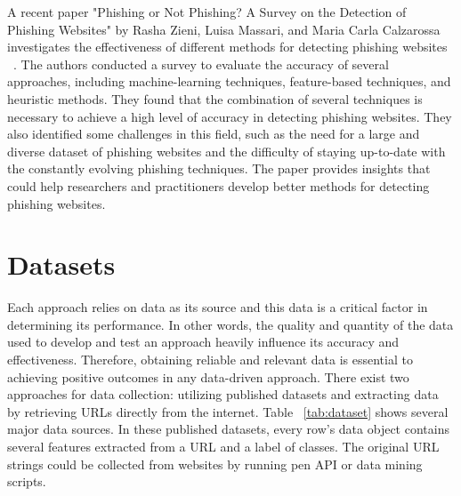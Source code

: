 \documentclass[final]{cvpr}
\begin{document}
A recent paper "Phishing or Not Phishing? A Survey on the Detection of Phishing Websites" by Rasha Zieni, Luisa Massari, and Maria Carla Calzarossa investigates the effectiveness of different methods for detecting phishing websites ~\cite{zieni2019phishing}. The authors conducted a survey to evaluate the accuracy of several approaches, including machine-learning techniques, feature-based techniques, and heuristic methods. They found that the combination of several techniques is necessary to achieve a high level of accuracy in detecting phishing websites. They also identified some challenges in this field, such as the need for a large and diverse dataset of phishing websites and the difficulty of staying up-to-date with the constantly evolving phishing techniques. The paper provides insights that could help researchers and practitioners develop better methods for detecting phishing websites.

\section{Datasets}
\label{sec:Datasets}

Each approach relies on data as its source and this data is a critical factor in determining its performance. In other words, the quality and quantity of the data used to develop and test an approach heavily influence its accuracy and effectiveness. Therefore, obtaining reliable and relevant data is essential to achieving positive outcomes in any data-driven approach. There exist two approaches for data collection: utilizing published datasets and extracting data by retrieving URLs directly from the internet. Table ~\ref{tab:dataset} shows several major data sources. In these published datasets, every row’s data object contains several features extracted from a URL and a label of classes. The original URL strings could be collected from websites by running pen API or data mining scripts.
\end{document}
